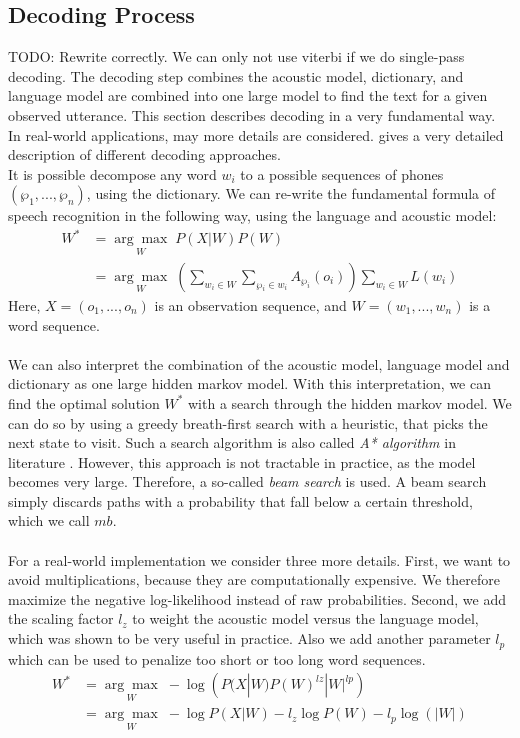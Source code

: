 \subsection{Decoding Process}
TODO: Rewrite correctly. We can only not use viterbi if we do single-pass decoding. 
The decoding step combines the acoustic model, dictionary, and language model are combined into one large model to find the text for a given observed utterance. This section describes decoding in a very fundamental way. In real-world applications, may more details are considered.  \cite{huang2001spoken} gives a very detailed description of different decoding approaches.\\
It is possible decompose any word $w_i$ to a possible sequences of phones $(\wp_1, ..., \wp_n)$, using the dictionary. We can re-write the fundamental formula of speech recognition in the following way, using the language and acoustic model:
\begin{align*}
W^* &= \underset{W}{\arg \max} \; P(X|W) P(W) \\
&= \underset{W}{\arg \max} \; \left( \sum_{w_i \in W} \sum_{\wp_i \in w_i} A_{\wp_i}(o_i) \right) \sum_{w_i \in W} L(w_i)
\end{align*}
Here, $X = (o_1, ..., o_n)$ is an observation sequence, and $W = (w_1, ..., w_n)$ is a word sequence. \\ \\ 
We can also interpret the combination of the acoustic model, language model and dictionary as one large hidden markov model. With this interpretation, we can find the optimal solution $W^*$ with a search through the hidden markov model. We can do so by using a greedy breath-first search with a heuristic, that picks the next state to visit. Such a search algorithm is also called \textit{A* algorithm} in literature \cite{hart1968formal}. However, this approach is not tractable in practice, as the model becomes very large. Therefore, a so-called \textit{beam search} is used. A beam search simply discards paths with a probability that fall below a certain threshold, which we call $mb$. \\ \\
For a real-world implementation we consider three more details. First, we want to avoid multiplications, because they are computationally expensive. We therefore maximize the negative log-likelihood instead of raw probabilities. Second, we add the scaling factor $l_z$ to weight the acoustic model versus the language model, which was shown to be very useful in practice. Also we add another parameter $l_p$ which can be used to penalize too short or too long word sequences. 
\begin{align*}
W^* &= \underset{W}{\arg \max} \; -\log\left(P(X|W) P(W)^{lz} |W|^{lp} \right) \\
&= \underset{W}{\arg \max} \; -\log P(X|W) - l_z\log P(W) -l_p\log(|W|) 
\end{align*}

